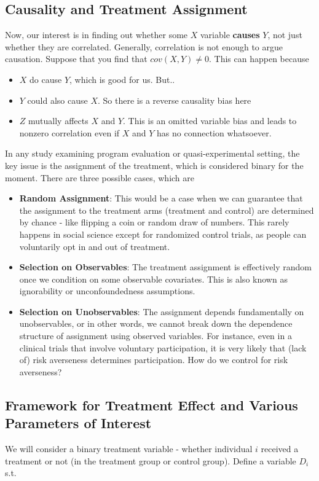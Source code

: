 \documentclass[12pt]{article}
\theoremstyle{definition}
\theoremstyle{property}
\theoremstyle{assumption}
\theoremstyle{example}
\theoremstyle{comment}
\begin{document}
\subsection{Causality and Treatment Assignment}
Now, our interest is in finding out whether some $X$ variable \textbf{causes} $Y$, not just whether they are correlated. Generally, correlation is not enough to argue causation. Suppose that you find that $cov(X,Y)\neq0$. This can happen because
\begin{itemize}
\item $X$ do cause $Y$, which is good for us. But..
\item $Y$ could also cause $X$. So there is a reverse causality bias here
\item $Z$ mutually affects $X$ and $Y$. This is an omitted variable bias and leads to nonzero correlation even if $X$ and $Y$ has no connection whatsoever. 
\end{itemize} \par
In any study examining program evaluation or quasi-experimental setting, the key issue is the assignment of the treatment, which is considered binary for the moment. There are three possible cases, which are
\begin{itemize}
\item \textbf{Random Assignment}: This would be a case when we can guarantee that the assignment to the treatment arms (treatment and control) are determined by chance - like flipping a coin or random draw of numbers. This rarely happens in social science except for randomized control trials, as people can voluntarily opt in and out of treatment. 
\item \textbf{Selection on Observables}: The treatment assignment is effectively random once we condition on some observable covariates. This is also known as ignorability or unconfoundedness assumptions.
\item \textbf{Selection on Unobservables}: The assignment depends fundamentally on unobservables, or in other words, we cannot break down the dependence structure of assignment using observed variables. For instance, even in a clinical trials that involve voluntary participation, it is very likely that (lack of) risk averseness determines participation. How do we control for risk averseness?
\end{itemize}

\subsection{Framework for Treatment Effect and Various Parameters of Interest}
We will consider a binary treatment variable - whether individual $i$ received a treatment or not (in the treatment group or control group). Define a variable $D_i$ s.t.
\end{document}
